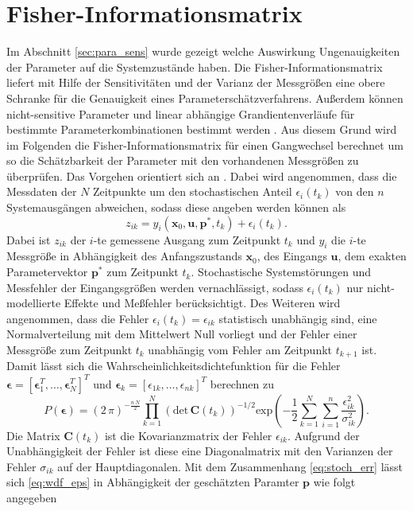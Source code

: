 \section{Fisher-Informationsmatrix}
Im Abschnitt \ref{sec:para_sens} wurde gezeigt welche Auswirkung Ungenauigkeiten der Parameter auf die Systemzustände haben. Die Fisher-Informationsmatrix liefert mit Hilfe der Sensitivitäten und der Varianz der Messgrößen eine obere Schranke für die Genauigkeit eines Parameterschätzverfahrens. Außerdem können nicht-sensitive Parameter und linear abhängige Grandientenverläufe für bestimmte Parameterkombinationen bestimmt werden \cite{Majer.1998}. Aus diesem Grund wird im Folgenden die Fisher-Informationsmatrix für einen Gangwechsel berechnet um so die Schätzbarkeit der Parameter mit den vorhandenen Messgrößen zu überprüfen. Das Vorgehen orientiert sich an \cite{Majer.1998}. Dabei wird angenommen, dass die Messdaten der $N$ Zeitpunkte um den stochastischen Anteil $\epsilon_i(t_k)$ von den $n$ Systemausgängen abweichen, sodass diese angeben werden können als
\begin{equation}\label{eq:stoch_err}
z_{ik} = y_i(\pmb{x}_0,\pmb{u},\pmb{p}^*,t_k) + \epsilon_i(t_k).
\end{equation}
Dabei ist $z_{ik}$ der $i$-te gemessene Ausgang zum Zeitpunkt $t_k$ und $y_i$ die $i$-te Messgröße in Abhängigkeit des Anfangszustands $\pmb{x}_0$, des Eingangs $\pmb{u}$, dem exakten Parametervektor $\pmb{p}^*$ zum Zeitpunkt $t_k$. Stochastische Systemstörungen und Messfehler der Eingangsgrößen werden vernachlässigt, sodass $\epsilon_i(t_k)$ nur nicht-modellierte Effekte und Meßfehler berücksichtigt. Des Weiteren wird angenommen, dass die Fehler  $\epsilon_i(t_k) = \epsilon_{ik}$ statistisch unabhängig sind, eine Normalverteilung mit dem Mittelwert Null vorliegt und der Fehler einer Messgröße zum Zeitpunkt $t_k$ unabhängig vom Fehler am Zeitpunkt $t_{k+1}$ ist. Damit lässt sich die Wahrscheinlichkeitsdichtefunktion für die Fehler $\pmb{\epsilon} = [\pmb{\epsilon}_1^T,\dots,\pmb{\epsilon}_N^T]^T$ und $\pmb{\epsilon}_k = [\epsilon_{1k},\dots,\epsilon_{nk}]^T$ berechnen zu
\begin{equation}\label{eq:wdf_eps}
P(\pmb{\epsilon}) = (2\, \pi)^{-\frac{n\,N}{2}}\prod^N_{k=1}\left(\mathrm{det}\,\pmb{C}(t_k)\right)^{-1/2}\mathrm{exp}\left(-\frac{1}{2}\sum^N_{k=1}\sum^n_{i=1}\frac{\epsilon^2_{ik}}{\sigma^2_{ik}}\right).
\end{equation}
Die Matrix $\pmb{C}(t_k)$ ist die Kovarianzmatrix der Fehler $\epsilon_{ik}$. Aufgrund der Unabhängigkeit der Fehler ist diese eine Diagonalmatrix mit den Varianzen der Fehler $\sigma_{ik}$ auf der Hauptdiagonalen. Mit dem Zusammenhang \eqref{eq:stoch_err} lässt sich \eqref{eq:wdf_eps} in Abhängigkeit der geschätzten Paramter $\pmb{p}$ wie folgt angegeben
